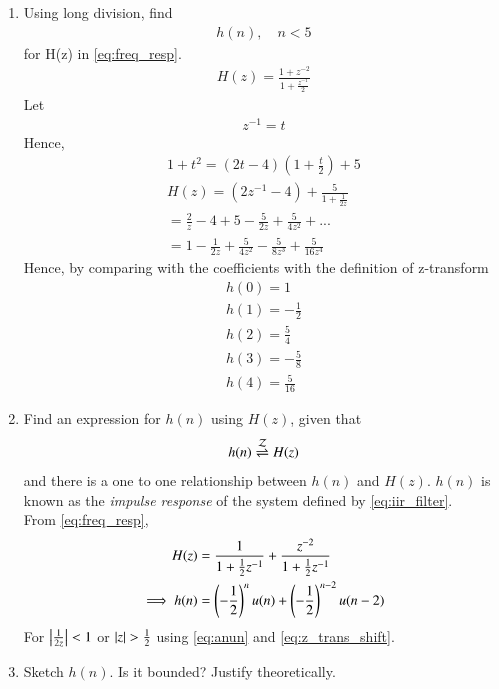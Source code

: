 \documentclass[journal,12pt,twocolumn]{IEEEtran}
\renewcommand\thesection{\arabic{section}}
\begin{document}
\begin{enumerate}[label=\thesection.\arabic*]
	\item Using long division, 
find
		\begin{align}
			h(n), \quad n < 5
		\end{align}
		for H(z) in 
		\eqref{eq:freq_resp}.
\\
\solution
\begin{align}
	H(z) = \frac{1+z^{-2}}{1+\frac{z^{-1}}{2}}
\end{align}
Let
\begin{align}
	z^{-1} = t
\end{align}
Hence,
\begin{align}
	1+t^{2} = (2t-4)(1+\frac{t}{2})+5
	\\
	H(z) = (2z^{-1}-4) + \frac{5}{1+\frac{1}{2z}}
	\\
	= \frac{2}{z} - 4 + 5 - \frac{5}{2z} + \frac{5}{4z^{2}}+...
	\\
	= 1 - \frac{1}{2z} + \frac{5}{4z^{2}} - \frac{5}{8z^{3}} + \frac{5}{16z^{4}}
\end{align}
Hence, by comparing with the coefficients with the definition of z-transform
\begin{align}
	h(0) = 1
	\\
	h(1) = -\frac{1}{2}
	\\
	h(2) = \frac{5}{4}
	\\
	h(3) = -\frac{5}{8}
	\\
	h(4) = \frac{5}{16}
\end{align}
\item \label{prob:impulse_resp}
Find an expression for $h(n)$ using $H(z)$, given that 
\begin{equation}
\label{eq:impulse_resp}
h(n) \overset{\mathcal{Z}}{ \rightleftharpoons} H(z)
\end{equation}
and there is a one to one relationship between $h(n)$ and $H(z)$. $h(n)$ is known as the {\em impulse response} of the
system defined by \eqref{eq:iir_filter}.
\\
\solution From \eqref{eq:freq_resp},
\begin{align}
H(z) &= \frac{1}{1 + \frac{1}{2}z^{-1}} + \frac{ z^{-2}}{1 + \frac{1}{2}z^{-1}}
\\
\implies h(n) &= \left(-\frac{1}{2}\right)^{n}u(n) + \left(-\frac{1}{2}\right)^{n-2}u(n-2)
\end{align}
For $\left\vert\frac{1}{2z}\right\vert<1$ or $\left\vert z\right\vert>\frac{1}{2}$
using \eqref{eq:anun} and \eqref{eq:z_trans_shift}.
\item Sketch $h(n)$. Is it bounded? Justify theoretically.

\end{enumerate}
\end{document}
